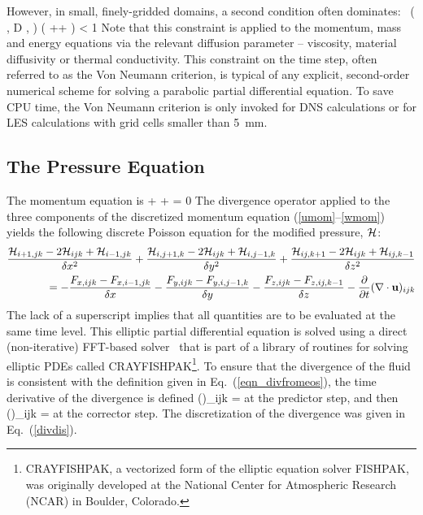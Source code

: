 \documentclass[11pt]{book}
\begin{document}
However, in small, finely-gridded domains, a second condition often dominates:
 \, \max \left( \nu , D ,  \right)  \; \dt  \left(
              ++ \right) < 1  \label{vn} \ee
Note that this constraint is applied to the momentum, mass and energy equations via the
relevant diffusion parameter -- viscosity, material diffusivity or thermal conductivity.
This constraint on the time step, often referred to as the Von Neumann criterion, is typical
of any explicit, second-order numerical scheme for solving a parabolic partial differential
equation. To save CPU time, the Von Neumann criterion is only invoked for DNS calculations or for LES
calculations with grid cells smaller than 5~mm.

\clearpage
\subsection{The Pressure Equation}

The momentum equation is
\be {} + \bF + \nabla \cH = 0 \ee
The divergence operator applied to the three components of the
discretized momentum equation (\ref{umom}--\ref{wmom}) yields the following discrete Poisson equation for the modified pressure, ${\cal H}$:
\begin{eqnarray}
\frac{{\cal H}_{i+1,jk}-2{\cal H}_{ijk}+{\cal H}_{i-1,jk}}{\delta x^2} +
\frac{{\cal H}_{i,j+1,k}-2{\cal H}_{ijk}+{\cal H}_{i,j-1,k}}{\delta y^2} +
\frac{{\cal H}_{ij,k+1}-2{\cal H}_{ijk}+{\cal H}_{ij,k-1}}{\delta z^2} \nonumber \\ =
    -\frac{F_{x,ijk} - F_{x,i-1,jk}}{\delta x}
    -\frac{F_{y,ijk} - F_{y,i,j-1,k}}{\delta y}
    -\frac{F_{z,ijk} - F_{z,ij,k-1}}{\delta z} - \frac{\partial  }{\partial t}(\nabla \cdot {\bf u})_{ijk}
\end{eqnarray}
The lack of a superscript implies that all quantities are to be
evaluated at the same time level.
This elliptic partial differential equation is solved using a direct
(non-iterative) FFT-based solver~\cite{Sweet:1} that is part of a library of routines
for solving elliptic PDEs called CRAYFISHPAK\footnote{CRAYFISHPAK, a vectorized form of the
elliptic equation solver FISHPAK, was originally developed at the National Center for Atmospheric
Research (NCAR) in Boulder, Colorado.}.
To ensure that the divergence of the fluid is consistent with the definition
given in Eq.~(\ref{eqn_divfromeos}), the time derivative of the divergence is defined
\be {}(\nabla \cdot \bu)_{ijk} =
           \ee
at the predictor step, and then
\be {}(\nabla \cdot \bu)_{ijk} =
          \ee
at the corrector step. The discretization of the divergence was
given in Eq.~(\ref{divdis}).
\end{document}
